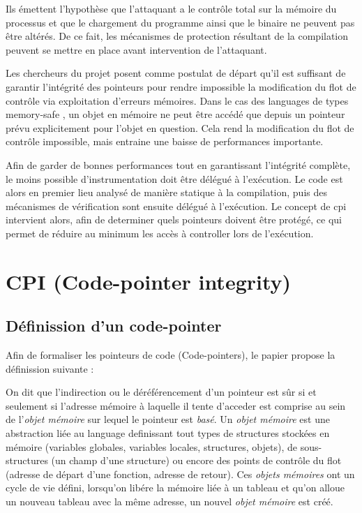 Ils émettent l'hypothèse que l'attaquant a le contrôle total sur la mémoire du processus et que le chargement du programme ainsi que le binaire ne peuvent pas être altérés. De ce fait, les mécanismes de protection résultant de la compilation peuvent se mettre en place avant intervention de l'attaquant.

Les chercheurs du projet posent comme postulat de départ qu'il est suffisant de garantir l'intégrité des pointeurs pour rendre impossible la modification du flot de contrôle via exploitation d'erreurs mémoires. Dans le cas des languages de types \og memory-safe \fg, un objet en mémoire ne peut être accédé que depuis un pointeur prévu explicitement pour l'objet en question. Cela rend la modification du flot de contrôle impossible, mais entraine une baisse de performances importante.

Afin de garder de bonnes performances tout en garantissant l'intégrité complète, le moins possible d'instrumentation doit être délégué à l'exécution. Le code est alors en premier lieu analysé de manière statique à la compilation, puis des mécanismes de vérification sont ensuite délégué à l'exécution. Le concept de \gls{cpi} \cite{CPIPaper} intervient alors, afin de determiner quels pointeurs doivent être protégé, ce qui permet de réduire au minimum les accès à controller lors de l'exécution.

\section{CPI (Code-pointer integrity)}


\subsection{Définission d'un code-pointer}

Afin de formaliser les pointeurs de code (Code-pointers), le papier propose la définission suivante :

On dit que l'indirection ou le déréférencement d'un pointeur est sûr si et seulement si l'adresse mémoire à laquelle il tente d'acceder est comprise au sein de l'\textit{objet mémoire} sur lequel le pointeur est \textit{basé}. Un \textit{objet mémoire} est une abstraction liée au language definissant tout types de structures stockées en mémoire (variables globales, variables locales, structures, objets), de sous-structures (un champ d'une structure) ou encore des points de contrôle du flot (adresse de départ d'une fonction, adresse de retour). Ces \textit{objets mémoires} ont un cycle de vie défini, lorsqu'on libére la mémoire liée à un tableau et qu'on alloue un nouveau tableau avec la même adresse, un nouvel \textit{objet mémoire} est créé.

